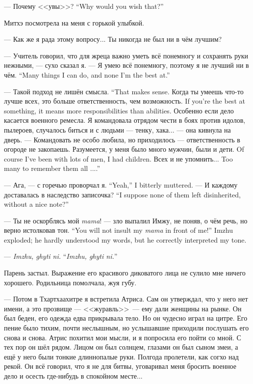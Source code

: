 {--- Почему <<увы>>?}
{``Why would you wish that?''}

Митхэ посмотрела на меня с горькой улыбкой.

--- Как же я рада этому вопросу...
Ты никогда не был ни в чём лучшим?

--- Учитель говорил, что для жреца важно уметь всё понемногу и сохранять руки нежными, --- сухо сказал я.
{--- Я умею всё понемногу, поэтому я не лучший ни в чём.}
{``Many things I can do, and none I'm the best at.''}

{--- Такой подход не лишён смысла.}
{``That makes sense.}
{Когда ты умеешь что-то лучше всех, это больше ответственность, чем возможность.}
{If you're the best at something, it means more responsibilities than abilities.}
Особенно если дело касается военного ремесла.
Я командовала отрядом чести в боях против идолов, пылероев, случалось биться и с людьми --- тенку, хака... --- она кивнула на дверь.
--- Командовать не особо любила, но приходилось --- ответственность в огороде не закопаешь.
{Разумеется, у меня было много мужчин, были и дети.}
{Of course I've been with lots of men, I had children.}
{Всех и не упомнить...}
{Too many to remember them all ....''}

{--- Ага, --- с горечью проворчал я.}
{``Yeah,'' I bitterly muttered.}
{--- И каждому доставалась в наследство записочка?}
{``I suppose none of them left disinherited, without a nice note?''}

{--- Ты не оскорблясь мой \textit{mama}! --- зло выпалил Имжу, не поняв, о чём речь, но верно истолковав тон.}
{``You will not insult my \textit{mama} in front of me!'' Imzhu exploded; he hardly understood my words, but he correctly interpreted my tone.}

{--- \textit{Imzhu, ghyti ni.}}
{``\textit{Imzhu, ghyti ni.}''}

Парень застыл.
Выражение его красивого диковатого лица не сулило мне ничего хорошего.
Родильница помолчала, жуя губу.

--- Потом в Тхартхаахитре я встретила Атриса.
Сам он утверждал, что у него нет имени, а это прозвище --- <<журавль>>\FM\ --- ему дали женщины на рынке.
Он был беден, его одежда едва прикрывала тело.
Но он чудесно играл на цитре.
Его пение было тихим, почти неслышным, но услышавшие приходили послушать его снова и снова.
Атрис похитил мои мысли, и я попросила его пойти со мной.
С тех пор он шёл рядом.
Лицом он был солнцем, глазами он был сыном змеи, а ещё у него были тонкие длиннопалые руки.
Полгода пролетели, как согхо над рекой.
Он всё говорил, что я не для битвы, уговаривал меня бросить военное дело и осесть где-нибудь в спокойном месте...

